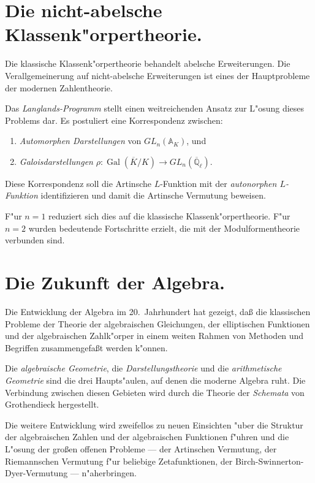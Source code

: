 \documentclass[12pt,a4paper]{article}
\theoremstyle{definition}
\begin{document}
\section{Die nicht-abelsche Klassenk"orpertheorie.}

Die klassische Klassenk"orpertheorie behandelt abelsche Erweiterungen. Die Verallgemeinerung auf nicht-abelsche Erweiterungen ist eines der Hauptprobleme der modernen Zahlentheorie.

\newpage

Das \emph{Langlands-Programm} stellt einen weitreichenden Ansatz zur L"osung dieses Problems dar. Es postuliert eine Korrespondenz zwischen:
\begin{enumerate}[label=\arabic*.]
\item \emph{Automorphen Darstellungen} von $GL_n(\mathbb{A}_K)$, und
\item \emph{Galoisdarstellungen} $\rho: \operatorname{Gal}(\overline{K}/K) \to GL_n(\overline{\mathbb{Q}}_\ell)$.
\end{enumerate}

Diese Korrespondenz soll die Artinsche $L$-Funktion mit der \emph{autonorphen $L$-Funktion} identifizieren und damit die Artinsche Vermutung beweisen.

F"ur $n = 1$ reduziert sich dies auf die klassische Klassenk"orpertheorie. F"ur $n = 2$ wurden bedeutende Fortschritte erzielt, die mit der Modulformentheorie verbunden sind.

\newpage

\section{Die Zukunft der Algebra.}

Die Entwicklung der Algebra im 20.~Jahrhundert hat gezeigt, da\ss{}{} die klassischen Probleme der Theorie der algebraischen Gleichungen, der elliptischen Funktionen und der algebraischen Zahlk"orper in einem weiten Rahmen von Methoden und Begriffen zusammengefa\ss{}t werden k"onnen.

Die \emph{algebraische Geometrie}, die \emph{Darstellungstheorie} und die \emph{arithmetische Geometrie} sind die drei Haupts"aulen, auf denen die moderne Algebra ruht. Die Verbindung zwischen diesen Gebieten wird durch die Theorie der \emph{Schemata} von Grothendieck hergestellt.

Die weitere Entwicklung wird zweifellos zu neuen Einsichten "uber die Struktur der algebraischen Zahlen und der algebraischen Funktionen f"uhren und die L"osung der gro\ss{}en offenen Probleme --- der Artinschen Vermutung, der Riemannschen Vermutung f"ur beliebige Zetafunktionen, der Birch-Swinnerton-Dyer-Vermutung --- n"aherbringen.
\end{document}
